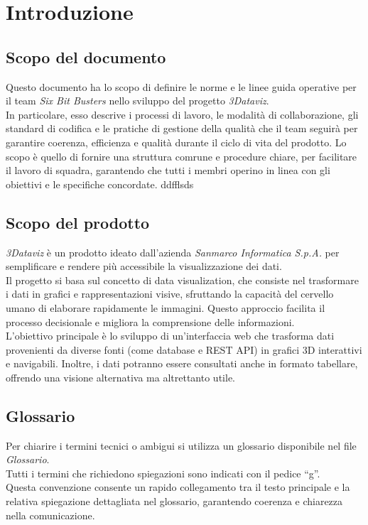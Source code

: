 \section{Introduzione}
    \subsection{Scopo del documento}
    Questo documento ha lo scopo di definire le norme e le linee guida operative per il team \textit{Six Bit Busters} nello sviluppo del progetto \textit{3Dataviz}.\\ 
    In particolare, esso descrive i processi di lavoro, le modalità di collaborazione, gli standard di codifica e le pratiche di gestione della qualità che il team seguirà per garantire coerenza, efficienza e qualità durante il ciclo di vita del prodotto. 
    Lo scopo è quello di fornire una struttura comrune e procedure chiare, per facilitare il lavoro di squadra, garantendo che tutti i membri operino in linea con gli obiettivi e le specifiche concordate.
ddfflsds
    \subsection{Scopo del prodotto}
    \textit{3Dataviz} è un prodotto ideato dall'azienda \textit{Sanmarco Informatica S.p.A.} per semplificare e rendere più accessibile la visualizzazione dei dati.\\
    Il progetto si basa sul concetto di data visualization, che consiste nel trasformare i dati in grafici e rappresentazioni visive, sfruttando la capacità del cervello umano di elaborare rapidamente le immagini. 
    Questo approccio facilita il processo decisionale e migliora la comprensione delle informazioni.\\
    L’obiettivo principale è lo sviluppo di un’interfaccia web che trasforma dati provenienti da diverse fonti (come database e REST API) in grafici 3D interattivi e navigabili. 
    Inoltre, i dati potranno essere consultati anche in formato tabellare, offrendo una visione alternativa ma altrettanto utile.  

    \subsection{Glossario}
    Per chiarire i termini tecnici o ambigui si utilizza un glossario disponibile nel file \textit{Glossario}.\\
    Tutti i termini che richiedono spiegazioni sono indicati con il pedice “g”. \\
    Questa convenzione consente un rapido collegamento tra il testo principale e la relativa spiegazione dettagliata nel glossario, garantendo coerenza e chiarezza nella comunicazione.

